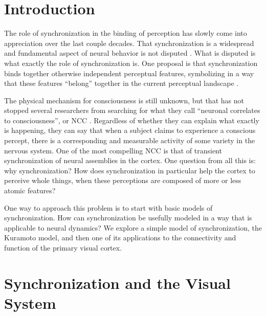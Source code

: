 \documentclass[12pt]{article}
\begin{document}
\maketitle

\section{Introduction}

The role of synchronization in the binding of perception has slowly come into appreciation over the last couple decades.  That synchronization is a widespread and fundamental aspect of neural behavior is not disputed \cite{Buzsaki}.  What is disputed is what exactly the role of synchronization is.  One proposal is that synchronization binds together otherwise independent perceptual features, symbolizing in a way that these features ``belong'' together in the current perceptual landscape \cite{Melloni}.  

The physical mechanism for consciousness is still unknown, but that has not stopped several researchers from searching for what they call ``neuronal correlates to consciousness'', or NCC \cite{Rees}.  Regardless of whether they can explain what exactly is happening, they can say that when a subject claims to experience a conscious percept, there is a corresponding and measurable activity of some variety in the nervous system.  One of the most compelling NCC is that of transient synchronization of neural assemblies in the cortex.  One question from all this is: why synchronization?  How does synchronization in particular help the cortex to perceive whole things, when these perceptions are composed of more or less atomic features?  

One way to approach this problem is to start with basic models of synchronization.  How can synchronization be usefully modeled in a way that is applicable to neural dynamics?  We explore a simple model of synchronization, the Kuramoto model, and then one of its applications to the connectivity and function of the primary visual cortex.

\section{Synchronization and the Visual System}
\end{document}
